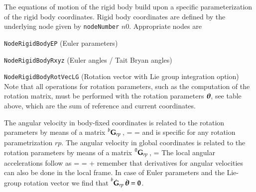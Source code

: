     \finishTable
    The equations of motion of the rigid body build upon a specific parameterization of the rigid body coordinates.
    Rigid body coordinates are defined by the underlying node given by \texttt{nodeNumber} $n0$.
    Appropriate nodes are 
    \bi
      \item \texttt{NodeRigidBodyEP} (Euler parameters)
      \item \texttt{NodeRigidBodyRxyz} (Euler angles / Tait Bryan angles)
      \item \texttt{NodeRigidBodyRotVecLG} (Rotation vector with Lie group integration option)
    \ei
    Note that all operations for rotation parameters, such as the computation of the rotation matrix, must be performed with the 
    rotation parameters $\mbox{\boldmath $\theta$ \unboldmath}\!\!$, see table above, which are the sum of reference and current coordinates.
    
    The angular velocity in body-fixed coordinates is related to the rotation parameters by means of a matrix $\prescript{b}{}{\mathbf{G}_{rp}}\,$,
    \be \label{eq:ObjectRigidBody:omegaLocal}
       =  \dot \ttheta =  \dot \tpsi \eqComma
    \ee
    and is specific for any rotation parametrization $rp$.
    The angular velocity in global coordinates is related to the rotation parameters by means of a matrix $\prescript{0}{}{\mathbf{G}_{rp}}\,$,
    \be \label{eq:ObjectRigidBody:omega}
       =  \dot \ttheta\eqDot
    \ee
    The local angular accelerations follow as
    \be \label{eq:ObjectRigidBody:alpha}
       = =  \ddot \ttheta +  \dot \ttheta \eqComma
    \ee
    remember that derivatives for angular velocities can also be done in the local frame. In case of Euler parameters and the Lie-group rotation vector we find that
    $\prescript{b}{}{\dot {\mathbf{G}}_{rp}}\, \dot {\mbox{\boldmath $\theta$ \unboldmath}\!\!} = \mathbf{0}$.
    
